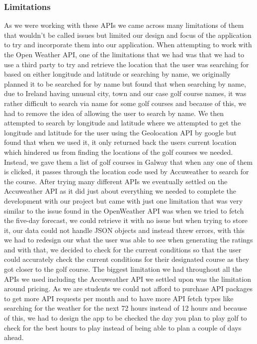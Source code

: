 \subsubsection{Limitations}
As we were working with these APIs we came across many limitations of them that wouldn’t be called issues but limited our design and focus of the application to try and incorporate them into our application.
\newline
\newline
When attempting to work with the Open Weather API, one of the limitations that we had was that we had to use a third party to try and retrieve the location that the user was searching for based on either longitude and latitude or searching by name, we originally planned it to be searched for by name but found that when searching by name, due to Ireland having unusual city, town and our case golf course names, it was rather difficult to search via name for some golf courses and because of this, we had to remove the idea of allowing the user to search by name.
\newline
\newline
We then attempted to search by longitude and latitude where we attempted to get the longitude and latitude for the user using the Geolocation API by google but found that when we used it, it only returned back the users current location which hindered us from finding the locations of the golf courses we needed. Instead, we gave them a list of golf courses in Galway that when any one of them is clicked, it passes through the location code used by Accuweather to search for the course.
\newline
\newline
After trying many different APIs we eventually settled on the Accuweather API as it did just about everything we needed to complete the development with our project but came with just one limitation that was very similar to the issue found in the OpenWeather API was when we tried to fetch the five-day forecast, we could retrieve it with no issue but when trying to store it, our data could not handle JSON objects and instead threw errors, with this we had to redesign our what the user was able to see when generating the ratings and with that, we decided to check for the current conditions so that the user could accurately check the current conditions for their designated course as they got closer to the golf course.
\newline
\newline
The biggest limitation we had throughout all the APIs we used including the Accuweather API we settled upon was the limitation around pricing. As we are students we could not afford to purchase API packages to get more API requests per month and to have more API fetch types like searching for the weather for the next 72 hours instead of 12 hours and because of this, we had to design the app to be checked the day you plan to play golf to check for the best hours to play instead of being able to plan a couple of days ahead.
